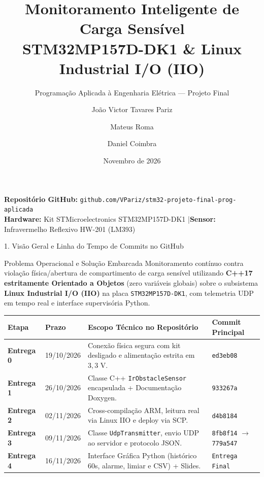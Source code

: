 \documentclass[aspectratio=169,10pt]{beamer}
\title[Monitoramento de Carga --- STM32MP1]{Monitoramento Inteligente de Carga Sens\'{i}vel\\STM32MP157D-DK1 \& Linux Industrial I/O (IIO)}
\subtitle{Programa\c{c}\~{a}o Aplicada \`{a} Engenharia El\'{e}trica --- Projeto Final}
\author[Grupo 3 --- SE/3 IME]{Jo\~{a}o Victor Tavares Pariz \and Mateus Roma \and Daniel Coimbra}
\institute[IME --- SE/3]{
  Instituto Militar de Engenharia --- IME\\
  Se\c{c}\~{a}o de Engenharia El\'{e}trica --- SE/3 (Eletr\^{o}nica)
}
\date{Novembro de 2026}
\begin{document}
\begin{frame}
  \titlepage
  \vspace{-0.4cm}
  \begin{center}
    \scriptsize
    \textbf{Reposit\'{o}rio GitHub:} \texttt{github.com/VPariz/stm32-projeto-final-prog-aplicada}\\
    \textbf{Hardware:} Kit STMicroelectronics STM32MP157D-DK1 \quad|\quad \textbf{Sensor:} Infravermelho Reflexivo HW-201 (LM393)
  \end{center}
\end{frame}

\begin{frame}{1. Vis\~{a}o Geral e Linha do Tempo de Commits no GitHub}
  \begin{block}{Problema Operacional e Solu\c{c}\~{a}o Embarcada}
    Monitoramento cont\'{i}nuo contra viola\c{c}\~{a}o f\'{i}sica/abertura de compartimento de carga sens\'{i}vel utilizando \textbf{C++17 estritamente Orientado a Objetos} (zero vari\'{a}veis globais) sobre o subsistema \textbf{Linux Industrial I/O (IIO)} na placa \texttt{STM32MP157D-DK1}, com telemetria UDP em tempo real e interface supervis\'{o}ria Python.
  \end{block}

  \vspace{0.1cm}
  \centering
  \footnotesize
  \begin{tabular}{llp{6.5cm}l}
    \toprule
    \textbf{Etapa} & \textbf{Prazo} & \textbf{Escopo T\'{e}cnico no Reposit\'{o}rio} & \textbf{Commit Principal} \\
    \midrule
    \textbf{Entrega 0} & 19/10/2026 & Conex\~{a}o f\'{i}sica segura com kit desligado e alimenta\c{c}\~{a}o estrita em $3{,}3\text{ V}$. & \texttt{ed3eb08} \\
    \textbf{Entrega 1} & 26/10/2026 & Classe C++ \texttt{IrObstacleSensor} encapsulada + Documenta\c{c}\~{a}o Doxygen. & \texttt{933267a} \\
    \textbf{Entrega 2} & 02/11/2026 & Cross-compila\c{c}\~{a}o ARM, leitura real via Linux IIO e deploy via SCP. & \texttt{d4b8184} \\
    \textbf{Entrega 3} & 09/11/2026 & Classe \texttt{UdpTransmitter}, envio UDP ao servidor e protocolo JSON. & \texttt{8fb8f14} $\rightarrow$ \texttt{779a547} \\
    \textbf{Entrega 4} & 16/11/2026 & Interface Gr\'{a}fica Python (hist\'{o}rico 60s, alarme, limiar e CSV) + Slides. & \texttt{Entrega Final} \\
    \bottomrule
  \end{tabular}
\end{frame}
\end{document}
